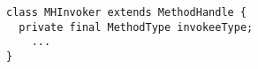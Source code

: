 {\scriptsize \begin{verbatim}
class MHInvoker extends MethodHandle {
  private final MethodType invokeeType;
    ...
}
\end{verbatim}}